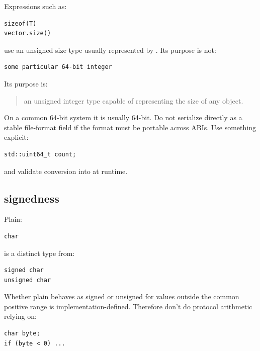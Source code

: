 Expressions such as:

\begin{verbatim}
sizeof(T)
vector.size()
\end{verbatim}

use an unsigned size type usually represented by . Its purpose is not:

\begin{verbatim}
some particular 64-bit integer
\end{verbatim}

Its purpose is:

\begin{quote}
an unsigned integer type capable of representing the size of any object.
\end{quote}

On a common 64-bit system it is usually 64-bit. Do not serialize  directly as a stable file-format field if the format must be portable across ABIs. Use something explicit:

\begin{verbatim}
std::uint64_t count;
\end{verbatim}

and validate conversion into  at runtime.

\subsection{\texorpdfstring{ signedness}{ signedness}}\label{01-foundations-i-ch002-char-signedness}

\hypertarget{01-foundations-i-ch002-char-signedness}{}

Plain:

\begin{verbatim}
char
\end{verbatim}

is a distinct type from:

\begin{verbatim}
signed char
unsigned char
\end{verbatim}

Whether plain  behaves as signed or unsigned for values outside the common positive range is implementation-defined. Therefore don't do protocol arithmetic relying on:

\begin{verbatim}
char byte;
if (byte < 0) ...
\end{verbatim}

